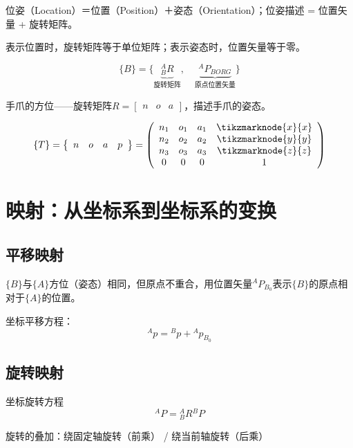 位姿（Location）＝位置（Position）＋姿态（Orientation）；位姿描述 = 位置矢量 + 旋转矩阵。

表示位置时，旋转矩阵等于单位矩阵；表示姿态时，位置矢量等于零。

$$
\{B\} = \{ \underbrace{{}^{A}_{B}R}_{\text{旋转矩阵}}, \quad \underbrace{{}^{A}P_{BORG}}_{\text{原点位置矢量}} \}
$$

手爪的方位——旋转矩阵$R=\left[\begin{array}{lll}n & o & a\end{array}\right]$，描述手爪的姿态。

$$
\{T\}=\left\{\begin{array}{llll}
n & o & a & p
\end{array}\right\}=
\left(\begin{array}{cccc}
n_1 & o_1 & a_1 & \tikzmarknode{x}{x} \\
n_2 & o_2 & a_2 & \tikzmarknode{y}{y} \\
n_3 & o_3 & a_3 & \tikzmarknode{z}{z} \\
0 & 0 & 0 & 1
\end{array}\right)
$$


\section{映射：从坐标系到坐标系的变换}

\subsection{平移映射}

\(\{B\}\)与\(\{A\}\)方位（姿态）相同，但原点不重合，用位置矢量${ }^A P_{B_0}$表示\(\{B\}\)的原点相对于\(\{A\}\)的位置。

坐标平移方程：
$$
{ }^A p = { }^B p + { }^A p_{B_0}
$$

\subsection{旋转映射}

坐标旋转方程
$$
{ }^A P = { }^A_B R { }^B P
$$

旋转的叠加：绕固定轴旋转（前乘） / 绕当前轴旋转（后乘）

